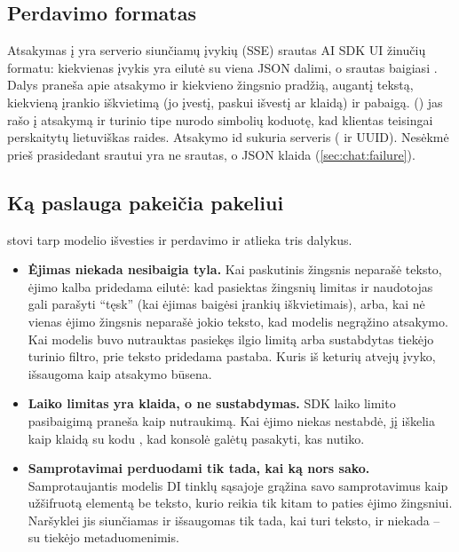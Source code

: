 \subsection{Perdavimo formatas}

Atsakymas į  yra serverio siunčiamų įvykių (SSE) srautas AI SDK
UI žinučių formatu: kiekvienas įvykis yra eilutė  su viena JSON dalimi, o srautas
baigiasi . Dalys praneša apie atsakymo ir kiekvieno žingsnio pradžią, augantį
tekstą, kiekvieną įrankio iškvietimą (jo įvestį, paskui išvestį ar klaidą) ir pabaigą.
 () jas rašo į atsakymą ir turinio tipe nurodo simbolių
koduotę, kad klientas teisingai perskaitytų lietuviškas raides. Atsakymo id sukuria serveris
( ir UUID). Nesėkmė prieš prasidedant srautui yra ne srautas, o JSON klaida
(\cref{sec:chat:failure}).

\subsection{Ką paslauga pakeičia pakeliui}\label{sec:chat:shape}

 stovi tarp modelio išvesties ir perdavimo ir atlieka tris dalykus.

\begin{itemize}
  \item \textbf{Ėjimas niekada nesibaigia tyla.} Kai paskutinis žingsnis neparašė teksto, ėjimo
    kalba pridedama eilutė: kad pasiektas žingsnių limitas ir naudotojas gali parašyti
    \enquote{tęsk} (kai ėjimas baigėsi įrankių iškvietimais), arba, kai nė vienas ėjimo žingsnis
    neparašė jokio teksto, kad modelis negrąžino atsakymo. Kai modelis buvo nutrauktas pasiekęs
    ilgio limitą arba sustabdytas tiekėjo turinio filtro, prie teksto pridedama pastaba. Kuris iš
    keturių atvejų įvyko, išsaugoma kaip atsakymo būsena.
  \item \textbf{Laiko limitas yra klaida, o ne sustabdymas.} SDK laiko limito pasibaigimą
    praneša kaip nutraukimą. Kai ėjimo niekas nestabdė,  jį iškelia kaip klaidą su
    kodu , kad konsolė galėtų pasakyti, kas nutiko.
  \item \textbf{Samprotavimai perduodami tik tada, kai ką nors sako.} Samprotaujantis modelis
    DI tinklų sąsajoje grąžina savo samprotavimus kaip užšifruotą elementą be teksto, kurio
    reikia tik kitam to paties ėjimo žingsniui. Naršyklei jis siunčiamas ir išsaugomas tik tada,
    kai turi teksto, ir niekada -- su tiekėjo metaduomenimis.
\end{itemize}

